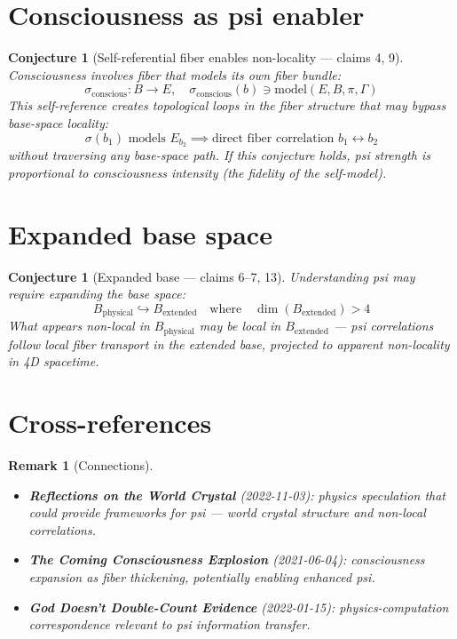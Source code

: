 \documentclass[11pt,a4paper]{article}
\newtheorem{remark}[definition]{Remark}
\newtheorem{conjecture}[definition]{Conjecture}
\begin{document}
\section{Consciousness as psi enabler}

\begin{conjecture}[Self-referential fiber enables non-locality --- claims 4, 9]
\label{conj:consciousness}
Consciousness involves fiber that models its own fiber bundle:
\[
  \sigma_{\text{conscious}}: B \to E, \quad
  \sigma_{\text{conscious}}(b) \ni \text{model}(E, B, \pi, \Gamma)
\]
This self-reference creates topological loops in the fiber structure
that may bypass base-space locality:
\[
  \sigma(b_1) \text{ models } E_{b_2} \implies \text{direct fiber
    correlation } b_1 \leftrightarrow b_2
\]
without traversing any base-space path. If this conjecture holds,
psi strength is proportional to consciousness intensity (the fidelity
of the self-model).
\end{conjecture}


\section{Expanded base space}

\begin{conjecture}[Expanded base --- claims 6--7, 13]
Understanding psi may require expanding the base space:
\[
  B_{\text{physical}} \hookrightarrow B_{\text{extended}}
  \quad \text{where} \quad \dim(B_{\text{extended}}) > 4
\]
What appears non-local in $B_{\text{physical}}$ may be local in
$B_{\text{extended}}$ --- psi correlations follow local fiber transport in
the extended base, projected to apparent non-locality in 4D spacetime.
\end{conjecture}

\section{Cross-references}

\begin{remark}[Connections]
\begin{itemize}
\item \textbf{Reflections on the World Crystal} (2022-11-03): physics
  speculation that could provide frameworks for psi --- world crystal
  structure and non-local correlations.
\item \textbf{The Coming Consciousness Explosion} (2021-06-04):
  consciousness expansion as fiber thickening, potentially enabling
  enhanced psi.
\item \textbf{God Doesn't Double-Count Evidence} (2022-01-15):
  physics-computation correspondence relevant to psi information transfer.
\end{itemize}
\end{remark}
\end{document}
